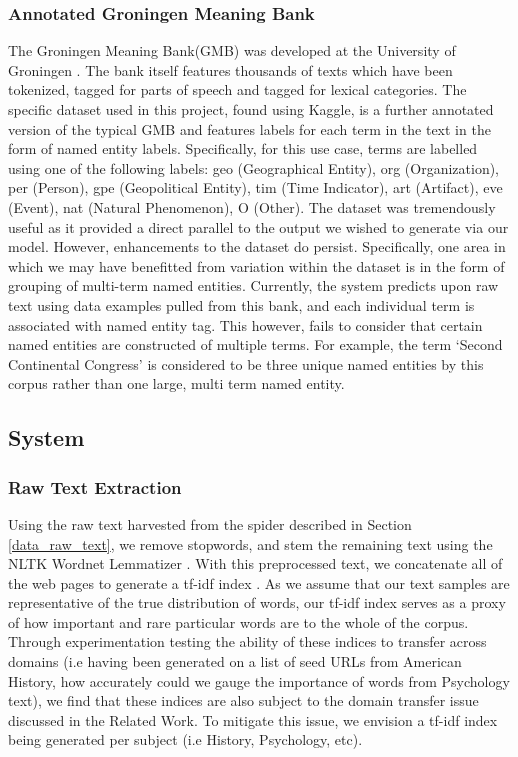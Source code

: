 \documentclass[11pt,a4paper]{article}
\begin{document}
\subsubsection{Annotated Groningen Meaning Bank}
The Groningen Meaning Bank(GMB) was developed at the University of Groningen \cite{Bos2017GMB}. The bank itself features thousands of texts which have been tokenized, tagged for parts of speech and tagged for lexical categories. The specific dataset used in this project, found using Kaggle, is a further annotated version of the typical GMB and features labels for each term in the text in the form of named entity labels. Specifically, for this use case, terms are labelled using one of the following labels: geo (Geographical Entity), org (Organization), per (Person), gpe (Geopolitical Entity), tim (Time Indicator), art (Artifact), eve (Event), nat (Natural Phenomenon), O (Other). The dataset was tremendously useful as it provided a direct parallel to the output we wished to generate via our model. However, enhancements to the dataset do persist. Specifically, one area in which we may have benefitted from variation within the dataset is in the form of grouping of multi-term named entities. Currently, the system predicts upon raw text using data examples pulled from this bank, and each individual term is associated with named entity tag. This however, fails to consider that certain named entities are constructed of multiple terms. For example, the term ‘Second Continental Congress’ is considered to be three unique named entities by this corpus rather than one large, multi term named entity. 

\subsection{System}
\subsubsection{Raw Text Extraction}
Using the raw text harvested from the spider described in Section \ref{data_raw_text}, we remove stopwords, and stem the remaining text using the NLTK Wordnet Lemmatizer \cite{Fellbaum1998}. With this preprocessed text, we concatenate all of the web pages to generate a tf-idf index \cite{Ramos_usingtf-idf}. As we assume that our text samples are representative of the true distribution of words, our tf-idf index serves as a proxy of how important and rare particular words are to the whole of the corpus. Through experimentation testing the ability of these indices to transfer across domains (i.e having been generated on a list of seed URLs from American History, how accurately could we gauge the importance of words from Psychology text), we find that these indices are also subject to the domain transfer issue discussed in the Related Work. To mitigate this issue, we envision a tf-idf index being generated per subject (i.e History, Psychology, etc).
\end{document}
